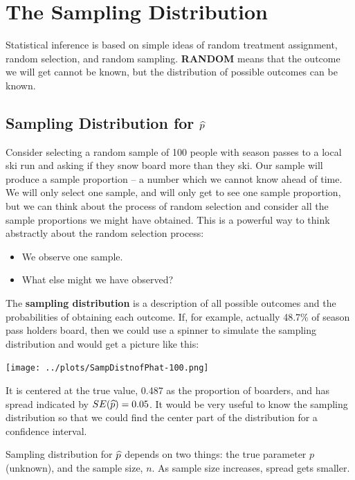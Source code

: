 \def\theTopic{Reading 9}

\section{ The Sampling Distribution}


 Statistical inference is based on simple ideas of random treatment
 assignment, random selection, and random sampling.   {\bf RANDOM} 
 means that the outcome we will get cannot be known, but the
 distribution of possible outcomes can be known. 


\subsection{ Sampling Distribution for $\widehat{p}$}

 Consider selecting a random sample of 100 people with season passes
 to a local ski run and asking if they snow board more than they ski.
 Our sample will produce a sample  proportion -- a number which we
 cannot know ahead of time.  We will only select 
 one sample, and will only get to see one sample proportion, but we
 can think about the process of random selection and consider all the
 sample proportions we might have obtained.  This is a powerful way to
 think abstractly about the random selection process:
 \begin{itemize}
 \item We observe one sample.
 \item What else might we have observed?
 \end{itemize}
  The {\bf sampling distribution} is a description of all possible
  outcomes and the probabilities of obtaining each outcome.  If, for
  example, actually 48.7\%  of season pass holders board, then we
  could use a spinner to simulate the sampling distribution and would
  get a picture like this:

  \texttt{[image: ../plots/SampDistnofPhat-100.png]}

It is centered at the true value, 0.487 as the proportion of boarders,
and has spread indicated by $SE(\widehat{p}) = 0.05$. 
It would be very useful to know the sampling distribution so that we
could find the center part of the distribution for a confidence
interval.  

Sampling distribution for $\widehat{p}$ depends on two things: the true
parameter $p$ (unknown), and the sample size, $n$. As sample size
increases, spread gets smaller. \vspace{1in}

